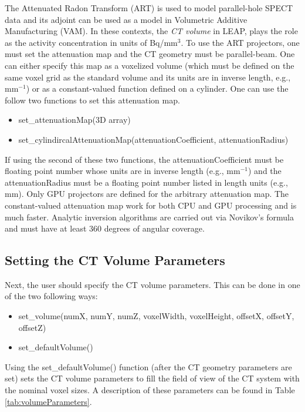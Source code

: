 \documentclass[11pt]{article}
\begin{document}
The Attenuated Radon Transform (ART) is used to model parallel-hole SPECT data and its adjoint can be used as a model in Volumetric Additive Manufacturing (VAM).  In  these contexts, the \textit{CT volume} in LEAP, plays the role as the activity concentration in units of Bq/mm$^3$.  To use the ART projectors, one must set the attenuation map and the CT geometry must be parallel-beam.  One can either specify this map as a voxelized volume (which must be defined on the same voxel grid as the standard volume and its units are in inverse length, e.g., mm$^{-1}$) or as a constant-valued function defined on a cylinder.  One can use the follow two functions to set this attenuation map.
\begin{itemize}
    \item[] set\_attenuationMap(3D array)
    \item[] set\_cylindircalAttenuationMap(attenuationCoefficient, attenuationRadius)
\end{itemize}
If using the second of these two functions, the attenuationCoefficient must be floating point number whose units are in inverse length (e.g., mm$^{-1}$) and the attenuationRadius must be a floating point number listed in length units (e.g., mm).  Only GPU projectors are defined for the arbitrary attenuation map.  The constant-valued attenuation map work for both CPU and GPU processing and is much faster.  Analytic inversion algorithms are carried out via Novikov's formula and must have at least 360 degrees of angular coverage.

\subsection{Setting the CT Volume Parameters}

Next, the user should specify the CT volume parameters.  This can be done in one of the two following ways:
\begin{itemize}
\item[] set\_volume(numX, numY, numZ, voxelWidth, voxelHeight, offsetX, offsetY, offsetZ)
\item[] set\_defaultVolume()
\end{itemize}
Using the set\_defaultVolume() function (after the CT geometry parameters are set) sets the CT volume parameters to fill the field of view of the CT system with the nominal voxel sizes.  A description of these parameters can be found in Table \ref{tab:volumeParameters}.
\end{document}

